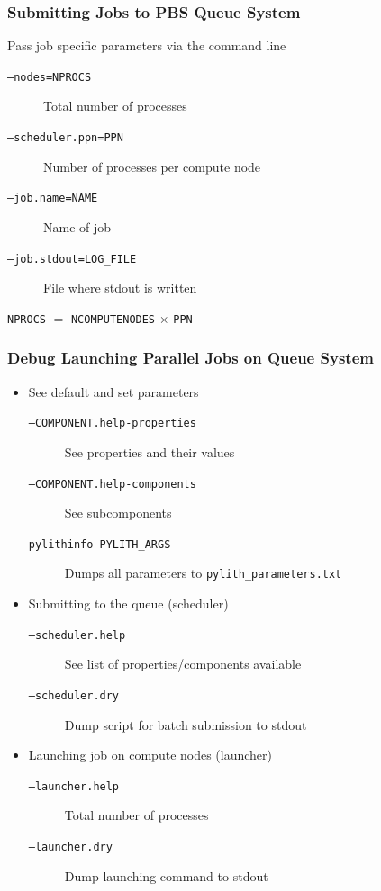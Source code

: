 \documentclass{beamer}
\begin{document}
\begin{frame}[fragile]
  \frametitle{Submitting Jobs to PBS Queue System}
  \summary{}

  Pass job specific parameters via the command line

  \begin{description}
  \item[{\tt--nodes=NPROCS}] Total number of processes
  \item[{\tt--scheduler.ppn=PPN}] Number of processes per compute node
  \item[{\tt --job.name=NAME}] Name of job
  \item[{\tt --job.stdout=LOG\_FILE}] File where stdout is written
  \end{description}

  \vfill
  {\tt NPROCS} $=$ {\tt NCOMPUTENODES} $\times$ {\tt PPN}
  \vfill

\end{frame}

\begin{frame}[fragile]
  \frametitle{Debug Launching Parallel Jobs on Queue System}

  \begin{itemize}
  \item See default and set parameters
    \begin{description}
    \item[{\tt--COMPONENT.help-properties}] See properties and their values
    \item[{\tt--COMPONENT.help-components}] See subcomponents
    \item[{\tt pylithinfo PYLITH\_ARGS}] Dumps all parameters to {\tt pylith\_parameters.txt}
    \end{description}
  \item Submitting to the queue (scheduler)
    \begin{description}
    \item[{\tt --scheduler.help}] See list of properties/components available
    \item[{\tt --scheduler.dry}] Dump script for batch submission to
      stdout
    \end{description}
  \item Launching job on compute nodes (launcher)
    \begin{description}
    \item[{\tt --launcher.help}] Total number of processes
    \item[{\tt --launcher.dry}] Dump launching command to stdout
    \end{description}
  \end{itemize}
  
  
\end{frame}

\end{document}
